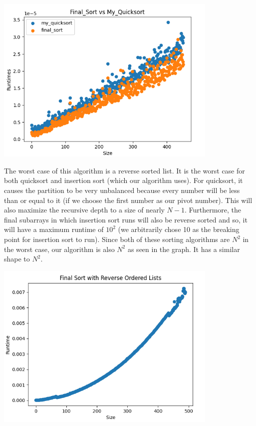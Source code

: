 \documentclass{article}
\begin{document}
\includegraphics[width=0.8\textwidth]{quicksortFinalSort}

The worst case of this algorithm is a reverse sorted list. It is the worst case for both quicksort and insertion sort (which our algorithm uses). For quicksort, it causes the partition to be very unbalanced because every number will be less than or equal to it (if we choose the first number as our pivot number). This will also maximize the recursive depth to a size of nearly $N-1$. Furthermore, the final subarrays in which insertion sort runs will also be reverse sorted and so, it will have a maximum runtime of $10^2$ (we arbitrarily chose 10 as the breaking point for insertion sort to run). Since both of these sorting algorithms are $N^2$ in the worst case, our algorithm is also $N^2$ as seen in the graph. It has a similar shape to $N^2$.

\includegraphics[width=0.8\textwidth]{finalSortReverseOrderedLists}
\end{document}

